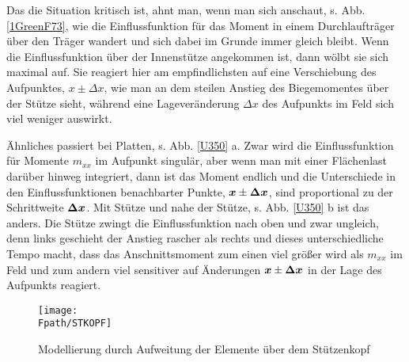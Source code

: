 Das die Situation kritisch ist, ahnt man, wenn man sich anschaut, s. Abb. \ref{1GreenF73}, wie die Einflussfunktion f\"{u}r das Moment in einem Durchlauftr\"{a}ger \"{u}ber den Tr\"{a}ger wandert  und sich dabei im Grunde immer gleich bleibt. Wenn die Einflussfunktion \"{u}ber der Innenst\"{u}tze angekommen ist, dann w\"{o}lbt sie sich maximal auf. Sie reagiert hier am empfindlichsten auf eine Verschiebung des Aufpunktes, $x \pm \Delta x$, wie man an dem steilen Anstieg des Biegemomentes \"{u}ber der St\"{u}tze sieht, w\"{a}hrend eine Lagever\"{a}nderung $\Delta x$ des Aufpunkts im Feld sich viel weniger auswirkt.

\"{A}hnliches passiert bei Platten, s. Abb. \ref{U350} a. Zwar wird die Einflussfunktion f\"{u}r Momente $m_{xx}$ im Aufpunkt singul\"{a}r, aber wenn man mit einer Fl\"{a}chenlast dar\"{u}ber hinweg integriert, dann ist das Moment endlich und die Unterschiede in den Einflussfunktionen benachbarter Punkte, $\mbox{\boldmath $x$} \pm \mbox{\boldmath $\Delta$} \mbox{\boldmath $x$}$, sind proportional zu der Schrittweite $\mbox{\boldmath $\Delta$} \mbox{\boldmath $x$}$. Mit St\"{u}tze und nahe der St\"{u}tze, s. Abb.  \ref{U350} b ist das anders. Die St\"{u}tze zwingt die Einflussfunktion nach oben und zwar ungleich, denn links geschieht der Anstieg rascher als rechts und dieses unterschiedliche Tempo macht, dass das Anschnittsmoment zum einen viel gr\"{o}{\ss}er wird als $m_{xx}$ im Feld und zum andern viel sensitiver auf \"{A}nderungen $\mbox{\boldmath $x$} \pm \mbox{\boldmath $\Delta$} \mbox{\boldmath $x$}$ in der Lage des Aufpunkts reagiert.
\begin{figure}[tbp]
\centering
\if {} \sidecaption \fi
\texttt{[image: \\Fpath/STKOPF]}
\caption{Modellierung durch Aufweitung der Elemente \"{u}ber dem St\"{u}tzenkopf}\label{StKopf}
\end{figure}%

